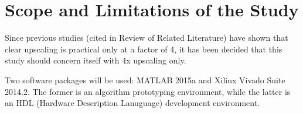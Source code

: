 \section{Scope and Limitations of the Study}

Since previous studies (cited in Review of Related Literature) have shown that clear upscaling is practical only at a factor of 4, it has been decided that this study should concern itself with 4x upscaling only.

Two software packages will be used: MATLAB 2015a and Xilinx Vivado Suite 2014.2.
The former is an algorithm prototyping environment, while the latter is an HDL (Hardware Description Lanuguage) development environment.



%
%
%
%

